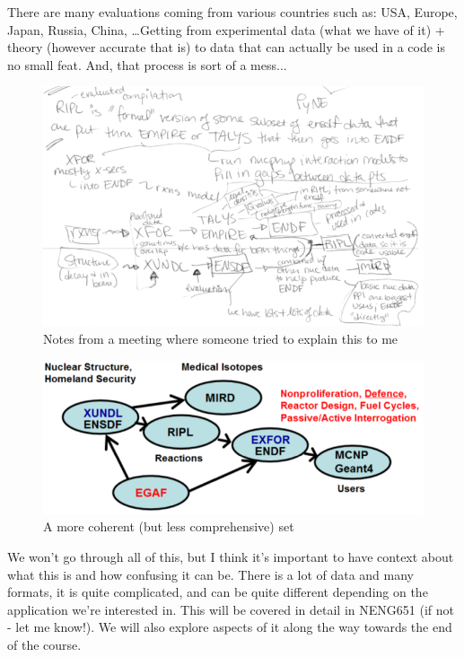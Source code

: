 \documentclass[12pt]{article}
\begin{document}
There are many evaluations coming from various countries such as: USA, Europe, Japan, Russia, China, \dots Getting from experimental data (what we have of it) + theory (however accurate that is) to data that can actually be used in a code is no small feat. And, that process is sort of a mess...
\begin{figure}[h!]
    \begin{center}
    \includegraphics[keepaspectratio, width = 6 in]{../figs/data-notes}
    \end{center}
    \caption{Notes from a meeting where someone tried to explain this to me}
    \label{fig:datanotes}
\end{figure}
\begin{figure}[h!]
    \begin{center}
    \includegraphics[keepaspectratio, width = 4.5 in]{../figs/hurst-code-map}
    \end{center}
    \caption{A more coherent (but less comprehensive) set}
    \label{fig:hurstfig}
\end{figure}

We won't go through all of this, but I think it's important to have context about what this is and how confusing it can be. There is a lot of data and many formats, it is quite complicated, and can be quite different depending on the application we're interested in. This will be covered in detail in NENG651 (if not - let me know!).  We will also explore aspects of it along the way towards the end of the course.
\end{document}
